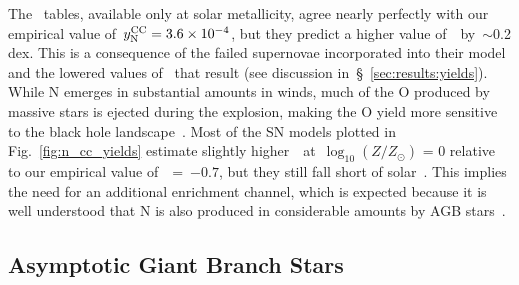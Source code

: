 \documentclass[ms.tex]{subfiles}
\begin{document}
The~\citet{Sukhbold2016} tables, available only at solar metallicity, agree
nearly perfectly with our empirical value of~$y_\text{N}^\text{CC} = 3.6\times10^{-4}$, but
they predict a higher value of~\no\subcc~by~$\sim$0.2 dex.
This is a consequence of the failed supernovae incorporated into their model
and the lowered values of~ that result (see discussion
in~\S~\ref{sec:results:yields}).
While N emerges in substantial amounts in winds, much of the O produced by
massive stars is ejected during the explosion, making the O yield more
sensitive to the black hole landscape~\citep{Griffith2021a}.
Most of the SN models plotted in Fig.~\ref{fig:n_cc_yields} estimate slightly
higher~\no\subcc~at~$\log_{10}(Z / Z_\odot)$ = 0 relative to our empirical
value of~\no\subcc~=~$-0.7$, but they still fall short of solar~\no.
This implies the need for an additional enrichment channel, which is expected
because it is well understood that N is also produced in considerable amounts
by AGB stars~\citep[e.g.][]{Johnson2019}.

\subsection{Asymptotic Giant Branch Stars}
\label{sec:yields:agb}
\end{document}
